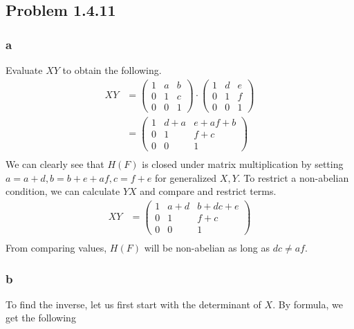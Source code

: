 \documentclass[11 pt]{article}
\theoremstyle{definition}
\theoremstyle{remark}
\begin{document}
\subsection*{Problem 1.4.11}
\subsubsection*{a}
Evaluate $XY$ to obtain the following.
\begin{align*}
XY &= \begin{pmatrix}
1 & a & b\\
0 & 1 & c\\
0 & 0 & 1
\end{pmatrix} \cdot \begin{pmatrix}
1 & d & e\\
0 & 1 & f\\
0 & 0 & 1
\end{pmatrix} \\
&= 
\begin{pmatrix}
1 & d+a & e+af+b\\
0 & 1 & f+c\\
0 & 0 & 1
\end{pmatrix}
\\
\end{align*}
We can clearly see that $H(F)$ is closed under matrix multiplication by setting $a = a+d, b = b+e+af, c = f+e$ for generalized $X,Y$. To restrict a non-abelian condition, we can calculate $YX$ and compare and restrict terms. 
\begin{align*}
XY &= 
\begin{pmatrix}
1 & a+d & b+dc+e\\
0 & 1 & f+c\\
0 & 0 & 1
\end{pmatrix}
\\
\end{align*}
From comparing values, $H(F)$ will be non-abelian as long as $dc \neq af$.

\subsubsection*{b}

To find the inverse, let us first start with the determinant of $X$. By formula, we get the following
\end{document}
